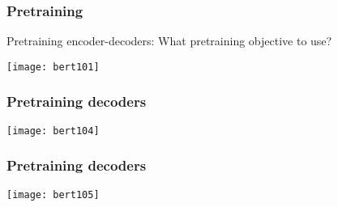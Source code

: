 \begin{frame}[fragile]\frametitle{Pretraining}

			Pretraining encoder-decoders: What pretraining objective to use?

			
			\begin{center}
			\texttt{[image: bert101]}
			\end{center}		
			

\end{frame}


\begin{frame}[fragile]\frametitle{Pretraining decoders}


			\begin{center}
			\texttt{[image: bert104]}
			\end{center}		
			

\end{frame}

\begin{frame}[fragile]\frametitle{Pretraining decoders}


			\begin{center}
			\texttt{[image: bert105]}
			\end{center}		
			

\end{frame}


			



